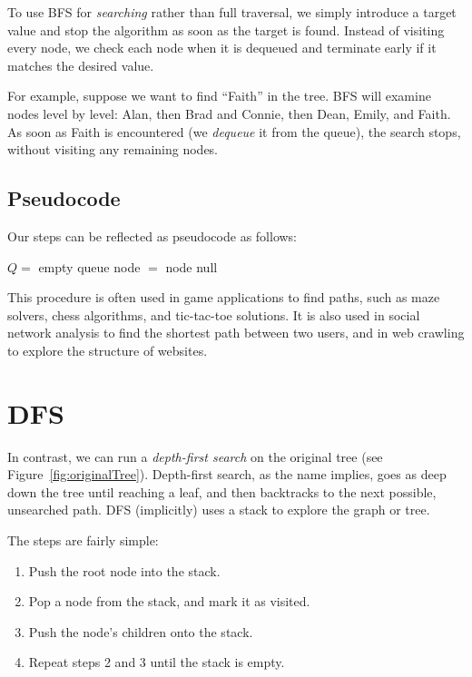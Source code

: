 
To use BFS for \emph{searching} rather than full traversal, we simply introduce a target value and stop the algorithm as soon as the target is found. Instead of visiting every node, we check each node when it is dequeued and terminate early if it matches the desired value.

For example, suppose we want to find ``Faith'' in the tree. BFS will examine nodes level by level: Alan, then Brad and Connie, then Dean, Emily, and Faith. As soon as Faith is encountered (we \emph{dequeue} it from the queue), the search stops, without visiting any remaining nodes.
\subsection{Pseudocode}
Our steps can be reflected as pseudocode as follows:
\begin{algorithm}
    \caption{Breadth-First Search (BFS) - Iterative}
    \begin{algorithmic}
        \State $Q =$ empty queue
        \State {}
        \State node $=$ 
        \State \Return node
        \EndIf
        \State {}
        \EndFor
        \EndWhile
        \State \Return null
        \EndProcedure
    \end{algorithmic}
\end{algorithm}

This procedure is often used in game applications to find paths, such as maze solvers, chess algorithms, and tic-tac-toe solutions. It is also used in social network analysis to find the shortest path between two users, and in web crawling to explore the structure of websites.
\section{DFS}

In contrast, we can run a \emph{depth-first search} on the original tree (see Figure~\ref{fig:originalTree}). Depth-first search, as the name implies, goes as deep down the tree until reaching a leaf, and then backtracks to the next possible, unsearched path. DFS (implicitly) uses a stack to explore the graph or tree.

The steps are fairly simple:
\begin{enumerate}
    \item Push the root node into the stack.
    \item Pop a node from the stack, and mark it as visited.
    \item Push the node's children onto the stack.
    \item Repeat steps 2 and 3 until the stack is empty.
\end{enumerate}


